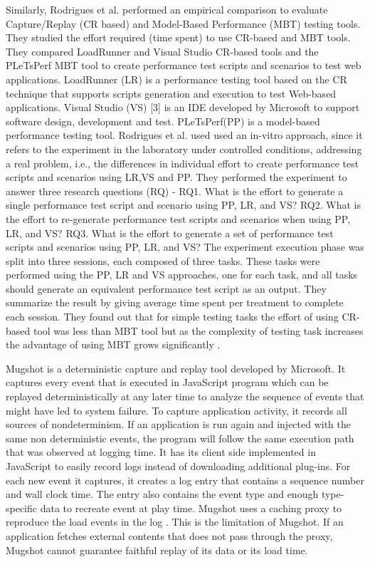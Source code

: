 \documentclass[12pt,journal]{IEEEtran}
\begin{document}
Similarly, Rodrigues et al.\cite{paper 2} performed an empirical comparison to evaluate Capture/Replay (CR based) and Model-Based Performance (MBT) testing tools. They studied the effort required (time spent) to use CR-based and MBT tools. They compared LoadRunner and Visual Studio CR-based tools and the PLeTsPerf MBT tool to create performance test scripts and scenarios to test web applications. LoadRunner (LR) is a performance testing tool based on the CR technique that supports scripts generation and execution to test Web-based applications. Visual Studio (VS) [3] is an IDE developed by Microsoft to support software design, development and test. PLeTsPerf(PP) is a model-based performance testing tool. Rodrigues et al. used used an in-vitro approach, since it refers to the experiment in the laboratory under controlled conditions, addressing a real problem, i.e., the differences in individual effort to create performance test scripts and scenarios using LR,VS and PP. They performed the experiment to answer three research questions (RQ) - RQ1. What is the effort to generate a single performance test script and scenario using PP, LR, and VS? RQ2. What is the effort to re-generate performance test scripts and scenarios when using PP, LR, and VS? RQ3. What is the effort to generate a set of performance test scripts and scenarios using PP, LR, and VS? The experiment execution phase was split into three sessions, each composed of three tasks. These tasks were performed using the PP, LR  and VS approaches, one for each task, and all tasks should generate an equivalent performance test script as an output. They summarize the result by giving average time spent per treatment to complete each session. They found out that for simple testing tasks the effort of using CR-based tool was less than MBT tool but as the complexity of testing task increases the advantage of using MBT grows significantly \cite{Rodrigues:2014:ECR:2652524.2652587}.

Mugshot\cite{Mugshot} is a deterministic capture and replay tool developed by Microsoft. It captures every event that is executed in JavaScript program which can be replayed deterministically at any later time to analyze the sequence of events that might have led to system failure. To capture application activity, it records all sources of nondeterminism. If an application is run again and injected with the same non deterministic events, the program will follow the same execution path that was observed at logging time. It has its client side implemented in JavaScript to easily record logs instead of downloading additional plug-ins. For each new event it captures, it creates a log entry that contains a sequence number and wall clock time. The entry also contains the event type and enough type-specific data to recreate event at play time. Mugshot uses a caching proxy to reproduce the load events in the log \cite{Mickens:2010:MDC:1855711.1855722}. This is the limitation of Mugshot. If an application fetches external contents that does not pass through the proxy, Mugshot cannot guarantee faithful replay of its data or its load time.
\end{document}
